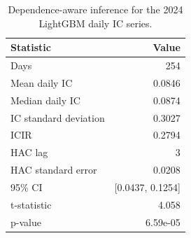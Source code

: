 \begin{table}[t]
\centering
\caption{Dependence-aware inference for the 2024 LightGBM daily IC series.}
\label{tab:inference}
\small
\begin{tabular}{@{}lr@{}}
\toprule
Statistic & Value \\
\midrule
Days & 254 \\
Mean daily IC & 0.0846 \\
Median daily IC & 0.0874 \\
IC standard deviation & 0.3027 \\
ICIR & 0.2794 \\
HAC lag & 3 \\
HAC standard error & 0.0208 \\
95\% CI & [0.0437, 0.1254] \\
t-statistic & 4.058 \\
p-value & 6.59e-05 \\
\bottomrule
\end{tabular}
\end{table}
